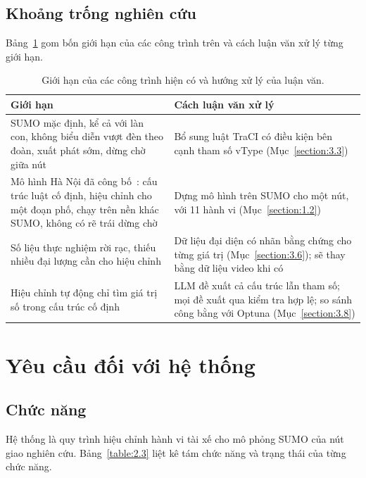 \documentclass[../DoAn.tex]{subfiles}
\begin{document}
\subsection{Khoảng trống nghiên cứu}
\label{subsection:2.1.5}

Bảng~\ref{table:2.2} gom bốn giới hạn của các công trình trên và cách luận văn xử lý từng giới hạn.

\begin{table}[ht]
\centering
\small
\caption{Giới hạn của các công trình hiện có và hướng xử lý của luận văn.}
\label{table:2.2}
\begin{tabular}{|p{5.2cm}|p{8.8cm}|}
\hline
\textbf{Giới hạn} & \textbf{Cách luận văn xử lý} \\
\hline
SUMO mặc định, kể cả với làn con, không biểu diễn vượt đèn theo đoàn, xuất phát sớm, dừng chờ giữa nút & Bổ sung luật TraCI có điều kiện bên cạnh tham số vType (Mục~\ref{section:3.3}) \\
\hline
Mô hình Hà Nội đã công bố~\cite{saval2023mixed}: cấu trúc luật cố định, hiệu chỉnh cho một đoạn phố, chạy trên nền khác SUMO, không có rẽ trái dừng chờ & Dựng mô hình trên SUMO cho một nút, với 11 hành vi (Mục~\ref{section:1.2}) \\
\hline
Số liệu thực nghiệm rời rạc, thiếu nhiều đại lượng cần cho hiệu chỉnh & Dữ liệu đại diện có nhãn bằng chứng cho từng giá trị (Mục~\ref{section:3.6}); sẽ thay bằng dữ liệu video khi có \\
\hline
Hiệu chỉnh tự động chỉ tìm giá trị số trong cấu trúc cố định & LLM đề xuất cả cấu trúc lẫn tham số; mọi đề xuất qua kiểm tra hợp lệ; so sánh công bằng với Optuna (Mục~\ref{section:3.8}) \\
\hline
\end{tabular}
\end{table}

\section{Yêu cầu đối với hệ thống}
\label{section:2.2}

\subsection{Chức năng}
\label{subsection:2.2.1}

Hệ thống là quy trình hiệu chỉnh hành vi tài xế cho mô phỏng SUMO của nút giao nghiên cứu. Bảng~\ref{table:2.3} liệt kê tám chức năng và trạng thái của từng chức năng.
\end{document}
